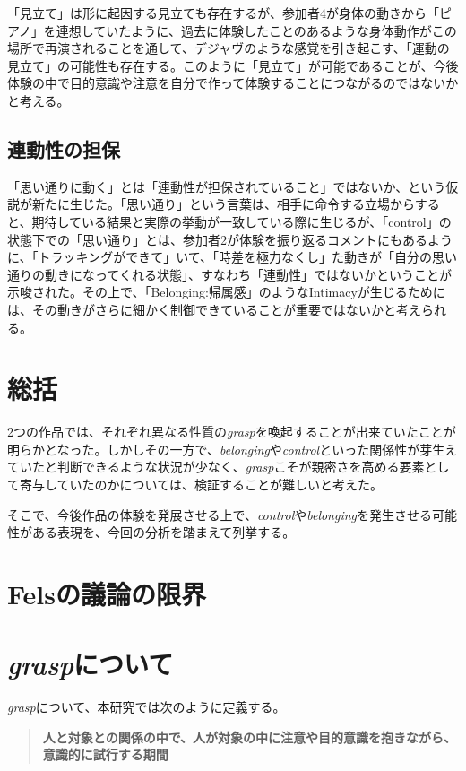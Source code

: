 「見立て」は形に起因する見立ても存在するが、参加者4が身体の動きから「ピアノ」を連想していたように、過去に体験したことのあるような身体動作がこの場所で再演されることを通して、デジャヴのような感覚を引き起こす、「運動の見立て」の可能性も存在する。このように「見立て」が可能であることが、今後体験の中で目的意識や注意を自分で作って体験することにつながるのではないかと考える。

\subsection{連動性の担保}
「思い通りに動く」とは「連動性が担保されていること」ではないか、という仮説が新たに生じた。「思い通り」という言葉は、相手に命令する立場からすると、期待している結果と実際の挙動が一致している際に生じるが、「control」の状態下での「思い通り」とは、参加者2が体験を振り返るコメントにもあるように、「トラッキングができて」いて、「時差を極力なくし」た動きが「自分の思い通りの動きになってくれる状態」、すなわち「連動性」ではないかということが示唆された。その上で、「Belonging:帰属感」のようなIntimacyが生じるためには、その動きがさらに細かく制御できていることが重要ではないかと考えられる。

\section{総括}
2つの作品では、それぞれ異なる性質の\textit{grasp}を喚起することが出来ていたことが明らかとなった。しかしその一方で、\textit{belonging}や\textit{control}といった関係性が芽生えていたと判断できるような状況が少なく、\textit{grasp}こそが親密さを高める要素として寄与していたのかについては、検証することが難しいと考えた。

そこで、今後作品の体験を発展させる上で、\textit{control}や\textit{belonging}を発生させる可能性がある表現を、今回の分析を踏まえて列挙する。

\section{Felsの議論の限界}

\section{\textit{grasp}について}
\textit{grasp}について、本研究では次のように定義する。

\begin{quote}
  \textbf{人と対象との関係の中で、人が対象の中に注意や目的意識を抱きながら、意識的に試行する期間}
\end{quote}

